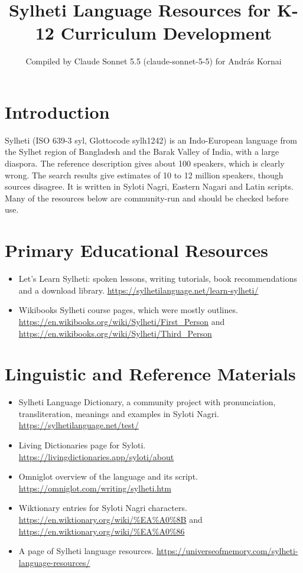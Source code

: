 \documentclass[12pt]{article}
\title{Sylheti Language Resources for K-12 Curriculum Development}
\author{Compiled by Claude Sonnet 5.5 (claude-sonnet-5-5) for Andr\'as Kornai}
\date{}
\begin{document}
\maketitle

\section{Introduction}
Sylheti (ISO 639-3 syl, Glottocode sylh1242) is an Indo-European language from the Sylhet region of Bangladesh and the Barak Valley of India, with a large diaspora. The reference description gives about 100 speakers, which is clearly wrong. The search results give estimates of 10 to 12 million speakers, though sources disagree. It is written in Syloti Nagri, Eastern Nagari and Latin scripts. Many of the resources below are community-run and should be checked before use.

\section{Primary Educational Resources}
\begin{itemize}
\item Let's Learn Sylheti: spoken lessons, writing tutorials, book recommendations and a download library. \url{https://sylhetilanguage.net/learn-sylheti/}
\item Wikibooks Sylheti course pages, which were mostly outlines. \url{https://en.wikibooks.org/wiki/Sylheti/First_Person} and \url{https://en.wikibooks.org/wiki/Sylheti/Third_Person}
\end{itemize}

\section{Linguistic and Reference Materials}
\begin{itemize}
\item Sylheti Language Dictionary, a community project with pronunciation, transliteration, meanings and examples in Syloti Nagri. \url{https://sylhetilanguage.net/test/}
\item Living Dictionaries page for Syloti. \url{https://livingdictionaries.app/syloti/about}
\item Omniglot overview of the language and its script. \url{https://omniglot.com/writing/sylheti.htm}
\item Wiktionary entries for Syloti Nagri characters. \url{https://en.wiktionary.org/wiki/%EA%A0%8B} and \url{https://en.wiktionary.org/wiki/%EA%A0%86}
\item A page of Sylheti language resources. \url{https://universeofmemory.com/sylheti-language-resources/}
\end{itemize}
\end{document}
